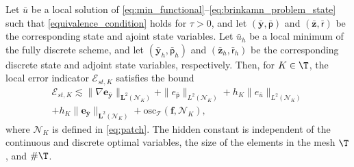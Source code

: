 \documentclass[final]{siamart0216}
\begin{document}
\begin{theorem}\label{eq:efficiency_est}
Let $\bar{u}$ be a local solution of \eqref{eq:min_functional}--\eqref{eq:brinkamn_problem_state} such that \eqref{equivalence_condition} holds for $\tau > 0$, and let $(\bar{\mathbf{y}},\bar{\mathsf{p}})$ and $(\bar{\mathbf{z}},\bar{\mathsf{r}})$ be the corresponding state and ajoint state variables. Let $\bar{u}_h$ be a local minimum of the fully discrete scheme, and let $(\bar{\mathbf{y}}_h,\bar{\mathsf{p}}_h)$ and $(\bar{\mathbf{z}}_h,\bar{\mathsf{r}}_h)$ be the corresponding discrete state and adjoint state variables, respectively. Then, for $K\in\T$, the local error indicator $\mathcal{E}_{st,K}$ satisfies the bound
\begin{multline}\label{eq:efficiency_estimates_est}
\mathcal{E}_{st,K} \lesssim\|\nabla \mathbf{e}_{\bar{\mathbf{y}}} \|_{\mathbf{L}^2(\mathcal{N}_{K})}+\| e_{\bar{\mathsf{p}}} \|_{L^2(\mathcal{N}_{K})}
+ h_K\|e_{\bar{u}}\|_{L^2(\mathcal{N}_{K})}\\
+h_{K}\|\mathbf{e}_{\bar{\mathbf{y}}}\|_{\mathbf{L}^2(\mathcal{N}_{K})}+\mathrm{osc}_{\mathscr{T}}(\mathbf{f},\mathcal{N}_{K}),
\end{multline}
where $\mathcal{N}_{K}$ is defined in \eqref{eq:patch}. The hidden constant is independent of the continuous and discrete optimal variables, the size of the elements in the mesh $\T$, and $\#\T$.
\end{theorem}
\end{document}
